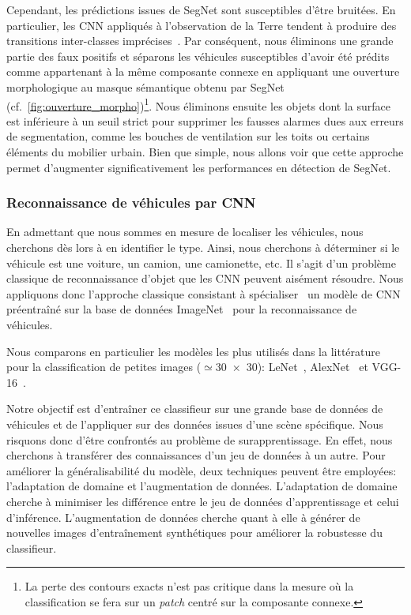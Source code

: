 Cependant, les prédictions issues de SegNet sont susceptibles d'être bruitées. En particulier, les \gls{CNN} appliqués à l'observation de la Terre tendent à produire des transitions inter-classes imprécises~\cite{marmanis_classification_2017}. Par conséquent, nous éliminons une grande partie des faux positifs et séparons les véhicules susceptibles d'avoir été prédits comme appartenant à la même composante connexe en appliquant une ouverture morphologique au masque sémantique obtenu par SegNet (cf.~\cref{fig:ouverture_morpho})\footnote{La perte des contours exacts n'est pas critique dans la mesure où la classification se fera sur un \emph{patch} centré sur la composante connexe.}. Nous éliminons ensuite les objets dont la surface est inférieure à un seuil strict pour supprimer les fausses alarmes dues aux erreurs de segmentation, comme les bouches de ventilation sur les toits ou certains éléments du mobilier urbain. Bien que simple, nous allons voir que cette approche permet d'augmenter significativement les performances en détection de SegNet.

\subsubsection{Reconnaissance de véhicules par \gls{CNN}}

En admettant que nous sommes en mesure de localiser les véhicules, nous cherchons dès lors à en identifier le type. Ainsi, nous cherchons à déterminer si le véhicule est une voiture, un camion, une camionette, etc. Il s'agit d'un problème classique de reconnaissance d'objet que les \gls{CNN} peuvent aisément résoudre. Nous appliquons donc l'approche classique consistant à spécialiser~\cite{nogueira_towards_2016,zhou_deep_2016} un modèle de \gls{CNN} préentraîné sur la base de données ImageNet~\cite{russakovsky_imagenet_2015} pour la reconnaissance de véhicules.

Nous comparons en particulier les modèles les plus utilisés dans la littérature pour la classification de petites images ($\simeq$\SI{30x30}{\px}): LeNet~\cite{lecun_gradient-based_1998}, \gls{AlexNet}~\cite{krizhevsky_imagenet_2012} et \gls{VGG-16}~\cite{simonyan_very_2015}.

Notre objectif est d'entraîner ce classifieur sur une grande base de données de véhicules et de l'appliquer sur des données issues d'une scène spécifique. Nous risquons donc d'être confrontés au problème de surapprentissage. En effet, nous cherchons à transférer des connaissances d'un jeu de données à un autre. Pour améliorer la généralisabilité du modèle, deux techniques peuvent être employées: l'adaptation de domaine et l'augmentation de données. L'adaptation de domaine cherche à minimiser les différence entre le jeu de données d'apprentissage et celui d'inférence. L'augmentation de données cherche quant à elle à générer de nouvelles images d'entraînement synthétiques pour améliorer la robustesse du classifieur.

